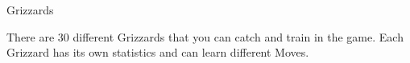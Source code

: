 \documentclass[10pt,twocolumn]{memoir}
\begin{document}
\newenvironment{grizzardpage}[6]{{%

    \vfill
  \section{#1}\label{grizzard:#1}

  Grizzard number: #2

  \subsection*{Starting Stats}

  \begin{description}
  \item[Attack]
    #4
  \item[Defend]
    #5
  \item[Maximum Hit Points]
    #3
  \end{description}

  \subsection*{Moves}

  See page~\pageref{sec:GrizzardMoves} for a guide to all the Grizzards' moves.

  \subsection*{Metamorphosis}

  \ifx\relax\detokenize{#6}\relax {

    #1 does not metamorphose (it is a final form).

  }\else {

    #1 will metamorphose into  #6 (see page~\pageref{grizzard:#6}) after
    gaining 36 experience points.

  }\fi

  \subsection*{Description}

}{}}

\chapter{Grizzards}

There  are 30  different  Grizzards  that you  can  catch  and train  in
the  game.  Each   Grizzard  has  its  own  statistics   and  can  learn
different Moves. 
\end{document}
